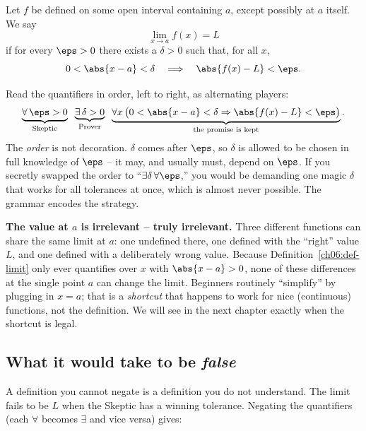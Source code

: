 \begin{definition}
\label{ch06:def-limit}
Let $f$ be defined on some open interval containing $a$, except possibly at $a$
itself. We say
\[
  \lim_{x \to a} f(x) = L
\]
if for every $\eps > 0$ there exists a $\delta > 0$ such that, for all $x$,
\[
  0 < \abs{x - a} < \delta
  \quad\Longrightarrow\quad
  \abs{f(x) - L} < \eps.
\]
\end{definition}

\begin{formalbox}
Read the quantifiers in order, left to right, as alternating players:
\[
  \underbrace{\forall\, \eps > 0}_{\text{Skeptic}}\;\;
  \underbrace{\exists\, \delta > 0}_{\text{Prover}}\;\;
  \underbrace{\forall x\,\big(0<\abs{x-a}<\delta \Rightarrow \abs{f(x)-L}<\eps\big)}_{\text{the promise is kept}}.
\]
The \emph{order} is not decoration. $\delta$ comes after $\eps$, so $\delta$ is
allowed to be chosen in full knowledge of $\eps$ -- it may, and usually must,
depend on $\eps$. If you secretly swapped the order to ``$\exists\delta\,
\forall\eps$,'' you would be demanding one magic $\delta$ that works for all
tolerances at once, which is almost never possible. The grammar encodes the
strategy.
\end{formalbox}

\begin{trapbox}
\textbf{The value at $a$ is irrelevant -- truly irrelevant.} Three different
functions can share the same limit at $a$: one undefined there, one defined with
the ``right'' value $L$, and one defined with a deliberately wrong value. Because
Definition~\ref{ch06:def-limit} only ever quantifies over $x$ with
$\abs{x-a}>0$, none of these differences at the single point $a$ can change the
limit. Beginners routinely ``simplify'' by plugging in $x=a$; that is a
\emph{shortcut} that happens to work for nice (continuous) functions, not the
definition. We will see in the next chapter exactly when the shortcut is legal.
\end{trapbox}

\subsection{What it would take to be \emph{false}}

A definition you cannot negate is a definition you do not understand. The limit
fails to be $L$ when the Skeptic has a winning tolerance. Negating the
quantifiers (each $\forall$ becomes $\exists$ and vice versa) gives:

